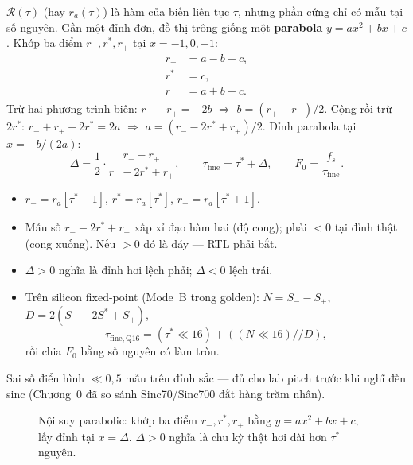 $\mathcal{R}(\tau)$ (hay $r_a(\tau)$) là hàm của biến liên tục $\tau$, nhưng phần cứng chỉ có mẫu tại số nguyên. Gần một đỉnh đơn, đồ thị trông giống một \textbf{parabola} $y = ax^2 + bx + c$. Khớp ba điểm $r_{-}, r^{*}, r_{+}$ tại $x = -1,0,+1$:
\begin{align*}
r_{-} &= a - b + c,\\
r^{*} &= c,\\
r_{+} &= a + b + c.
\end{align*}
Trừ hai phương trình biên: $r_{-}-r_{+} = -2b$ $\Rightarrow$ $b = (r_{+}-r_{-})/2$. Cộng rồi trừ $2r^{*}$: $r_{-}+r_{+}-2r^{*} = 2a$ $\Rightarrow$ $a = (r_{-}-2r^{*}+r_{+})/2$. Đỉnh parabola tại $x = -b/(2a)$:
\[
\Delta = \frac12\cdot\frac{r_{-}-r_{+}}{r_{-}-2r^{*}+r_{+}}, \qquad
\tau_{\mathrm{fine}} = \tau^{*} + \Delta, \qquad
F_0 = \frac{f_s}{\tau_{\mathrm{fine}}}.
\]
\begin{itemize}[leftmargin=1.4em]
\item $r_{-} = r_a[\tau^{*}-1]$, $r^{*} = r_a[\tau^{*}]$, $r_{+} = r_a[\tau^{*}+1]$.
\item Mẫu số $r_{-}-2r^{*}+r_{+}$ xấp xỉ đạo hàm hai (độ cong); phải $<0$ tại đỉnh thật (cong xuống). Nếu $>0$ đó là đáy --- RTL phải bắt.
\item $\Delta > 0$ nghĩa là đỉnh hơi lệch phải; $\Delta < 0$ lệch trái.
\item Trên silicon fixed-point (Mode~B trong golden): $N = S_{-}-S_{+}$, $D = 2(S_{-}-2S^{*}+S_{+})$,
\[
\tau_{\mathrm{fine,Q16}} = (\tau^{*}\ll 16) + ((N\ll 16)//D),
\]
rồi chia $F_0$ bằng số nguyên có làm tròn.
\end{itemize}

Sai số điển hình $\ll 0{,}5$ mẫu trên đỉnh sắc --- đủ cho lab pitch trước khi nghĩ đến sinc (Chương~0 đã so sánh Sinc70/Sinc700 đắt hàng trăm nhân).

\begin{figure}[H]
\centering
{}
\caption{Nội suy parabolic: khớp ba điểm $r_-,r^*,r_+$ bằng $y=ax^2+bx+c$, lấy đỉnh tại $x=\Delta$. $\Delta>0$ nghĩa là chu kỳ thật hơi dài hơn $\tau^*$ nguyên.}
\label{fig:ch09_parabolic}
\end{figure}

